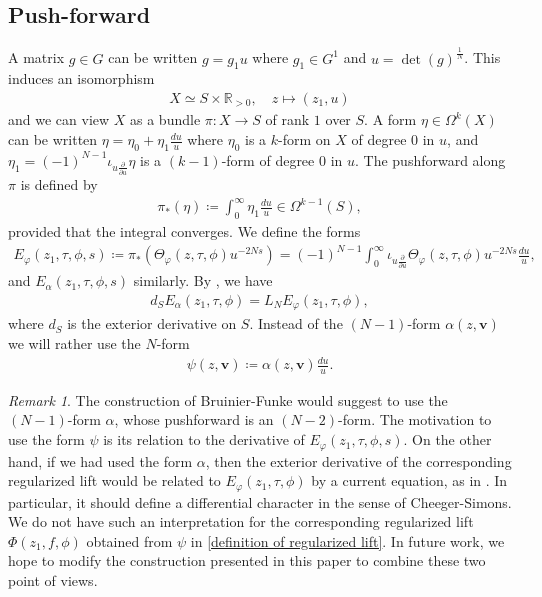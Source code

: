 \documentclass[twoside,a4paper,10pt]{article} %
\newcommand{\iotau}{\iota_{u\frac{\partial}{\partial u}}}
\newcommand{\8}{\infty}
\newcommand{\vbf}{\mathbf{v}}
\newcommand{\R}{\mathbb{R}}
\theoremstyle{mytheoremstyle}
\theoremstyle{remark}
\newtheorem{rmk}{Remark}[section]
\numberwithin{equation}{section}
\begin{document}
\subsection{Push-forward} A matrix $g \in G$ can be written $g=g_1u$ where $g_1 \in G^1$ and $u=\det(g)^{\frac{1}{N}}$. This induces an isomorphism
\begin{align}
X \simeq S \times \R_{>0}, \quad z \longmapsto (z_1,u)
\end{align} and we can view $X$ as a bundle $\pi \colon X \longrightarrow S$ of rank $1$ over $S$. A form $\eta \in \Omega^k(X)$ can be written $\eta=\eta_0+\eta_1\frac{du}{u}$ where $\eta_0$ is a $k$-form on $X$ of degree $0$ in $u$, and $\eta_1=(-1)^{N-1}\iotau \eta$ is a $(k-1)$-form of degree $0$ in $u$. The pushforward along $\pi$ is defined by
\begin{align}
\pi_\ast(\eta) \coloneqq \int_0^\8 \eta_1\frac{du}{u} \in \Omega^{k-1}(S),
\end{align}
provided that the integral converges. We define the forms
\begin{align} \label{define Ephi}
E_\varphi(z_1,\tau,\phi,s) \coloneqq \pi_\ast \left ( \Theta_{\varphi}(z,\tau,\phi)u^{-2Ns} \right )= (-1)^{N-1}\int_0^\8 \iotau \Theta_{\varphi}(z,\tau,\phi)u^{-2Ns} \frac{du}{u},
\end{align}
and  $E_\alpha(z_1,\tau,\phi,s)$ similarly. By \cite[Theorem.~4.19]{rbrsln}, we have 
\begin{align} \label{transgressionformula2}
d_SE_{\alpha}(z_1,\tau,\phi)=L_N E_{\varphi}(z_1,\tau,\phi),
\end{align}
where $d_S$ is the exterior derivative on $S$. Instead of the $(N-1)$-form $\alpha(z,\vbf)$ we will rather use the $N$-form
\begin{align} \label{definition of psi}
\psi(z,\vbf) \coloneqq \alpha(z,\vbf)\frac{du}{u}.
\end{align}
\begin{rmk} The construction of Bruinier-Funke \cite{BF04} would suggest to use the $(N-1)$-form $\alpha$, whose pushforward is an $(N-2)$-form. The motivation to use the form $\psi$ is its relation to the derivative of $E_{\varphi}(z_1,\tau,\phi,s)$.  On the other hand, if we had used the form $\alpha$, then the exterior derivative of the corresponding regularized lift would be related to $E_{\varphi}(z_1,\tau,\phi)$ by a current equation, as in \cite[Theorem.~1.5]{BF04}.  In particular, it should define a differential character in the sense of Cheeger-Simons. We do not have such an interpretation for the corresponding regularized lift $\Phi(z_1,f,\phi)$ obtained from $\psi$ in \eqref{definition of regularized lift}. In future work, we hope to modify the construction presented in this paper to combine these two point of views.
\end{rmk}
\end{document}
